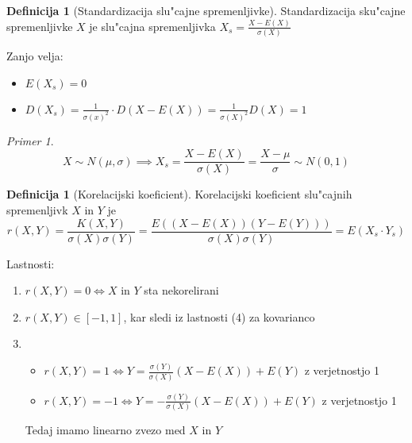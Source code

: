 \documentclass[a4paper,12pt]{article}
\theoremstyle{definition}
\newtheorem{defn}[counter]{Definicija}
\theoremstyle{remark}
\newtheorem*{ex}{Primer}
\begin{document}
\begin{defn}[Standardizacija slu"cajne spremenljivke]
    Standardizacija sku"cajne spremenljivke $X$ je slu"cajna spremenljivka $X_s = \frac{X-E(X)}{\sigma(X)}$ 
\end{defn}

Zanjo velja:
\begin{itemize}
    \item $E(X_s) = 0$
    \item $D(X_s) = \frac{1}{\sigma(x)^2} \cdot D(X-E(X)) = \frac{1}{\sigma(X)^2} D(X) = 1$
\end{itemize}

\begin{ex}
    \begin{equation*}
        X \sim N(\mu, \sigma) \implies X_s = \frac{X-E(X)}{\sigma(X)} = \frac{X-\mu}{\sigma} \sim N(0,1)
    \end{equation*}
\end{ex}

\begin{defn}[Korelacijski koeficient]
    Korelacijski koeficient slu"cajnih spremenljivk $X$ in $Y$ je
    \begin{equation*}
        r(X,Y) = \frac{K(X,Y)}{\sigma(X) \sigma(Y)} = \frac{E((X-E(X))(Y-E(Y)))}{\sigma(X)\sigma(Y)} = E(X_s \cdot Y_s)
    \end{equation*}
\end{defn}

Lastnosti:

\begin{enumerate}
    \item $r(X,Y) = 0 \iff X$ in $Y$ sta nekorelirani
    \item $r(X,Y) \in [-1,1]$, kar sledi iz lastnosti (4) za kovarianco
    \item \begin{itemize}
        \item $r(X,Y) = 1 \iff Y = \frac{\sigma(Y)}{\sigma(X)} (X-E(X)) + E(Y)$ z verjetnostjo 1
        \item $r(X,Y) = -1 \iff Y = -\frac{\sigma(Y)}{\sigma(X)} (X-E(X)) + E(Y)$ z verjetnostjo 1
    \end{itemize}
        Tedaj imamo linearno zvezo med $X$ in $Y$
\end{enumerate}
\end{document}
